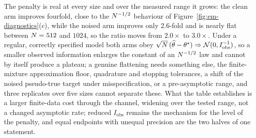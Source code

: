 The penalty is real at every size and over the measured range it grows: the
clean arm improves fourfold, close to the $N^{-1/2}$ behaviour of
Figure~\ref{fig:em-diagnostics}(c), while the noised arm improves only
$2.6$-fold and is nearly flat between $N = 512$ and $1024$, so the ratio
moves from $2.0\times$ to $3.0\times$. Under a regular, correctly specified
model both arms obey $\sqrt{N}\,(\widehat\theta - \theta^\star)
\Rightarrow \mathcal{N}(0, I_{\mathrm{obs}}^{-1})$, so a smaller observed information
enlarges the constant of an $N^{-1/2}$ law and cannot by itself produce
a plateau; a genuine flattening needs something else, the finite-mixture
approximation floor, quadrature and stopping tolerances, a shift of the
noised pseudo-true target under misspecification, or a pre-asymptotic range,
and three replicates over five sizes cannot separate these. What the table
establishes is a larger finite-data cost through the channel, widening over
the tested range, not a changed asymptotic rate; reduced $I_{\mathrm{obs}}$
remains the mechanism for the level of the penalty, and equal endpoints with
unequal precision are the two halves of one statement.
